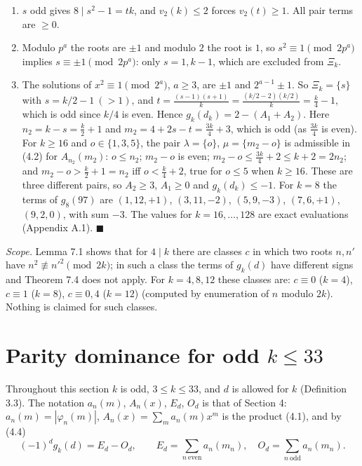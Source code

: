 \begin{enumerate}
\def\labelenumi{(\arabic{enumi})}
\setcounter{enumi}{1}
\item
  \(s\) odd gives \(8\mid s^2-1=tk\), and \(v_2(k)\le2\) forces \(v_2(t)\ge1\). All pair terms are \(\ge0\).
\item
  Modulo \(p^a\) the roots are \(\pm1\) and modulo \(2\) the root is \(1\), so \(s^2\equiv1\pmod{2p^a}\) implies \(s\equiv\pm1\pmod{2p^a}\): only \(s=1,k-1\), which are excluded from \(\Xi_k\).
\item
  The solutions of \(x^2\equiv1\pmod{2^a}\), \(a\ge3\), are \(\pm1\) and \(2^{a-1}\pm1\). So \(\Xi_k=\{s\}\) with \(s=k/2-1\ (>1)\), and \(t=\frac{(s-1)(s+1)}{k}=\frac{(k/2-2)(k/2)}{k}=\frac k4-1\), which is odd since \(k/4\) is even. Hence \(g_k(d_k)=2-(A_1+A_2)\). Here \(n_2=k-s=\frac k2+1\) and \(m_2=4+2s-t=\frac{3k}4+3\), which is odd (as \(\frac{3k}{4}\) is even). For \(k\ge16\) and \(o\in\{1,3,5\}\), the pair \(\lambda=\{o\}\), \(\mu=\{m_2-o\}\) is admissible in (4.2) for \(A_{n_2}(m_2)\): \(o\le n_2\); \(m_2-o\) is even; \(m_2-o\le\frac{3k}4+2\le k+2=2n_2\); and \(m_2-o>\frac k2+1=n_2\) iff \(o<\frac k4+2\), true for \(o\le5\) when \(k\ge16\). These are three different pairs, so \(A_2\ge3\), \(A_1\ge0\) and \(g_k(d_k)\le-1\). For \(k=8\) the terms of \(g_8(97)\) are \((1,12,+1)\), \((3,11,-2)\), \((5,9,-3)\), \((7,6,+1)\), \((9,2,0)\), with sum \(-3\). The values for \(k=16,\dots,128\) are exact evaluations (Appendix A.1). \(\blacksquare\)
\end{enumerate}

\emph{Scope.} Lemma 7.1 shows that for \(4\mid k\) there are classes \(c\) in which two roots \(n,n'\) have \(n^2\not\equiv n'^2\pmod{2k}\); in such a class the terms of \(g_k(d)\) have different signs and Theorem 7.4 does not apply. For \(k=4,8,12\) these classes are: \(c\equiv0\) (\(k=4\)), \(c\equiv1\) (\(k=8\)), \(c\equiv0,4\) (\(k=12\)) (computed by enumeration of \(n\) modulo \(2k\)). Nothing is claimed for such classes.

\section{\texorpdfstring{Parity dominance for odd \(k\le33\)}{Parity dominance for odd k\textbackslash le33}}\label{parity-dominance-for-odd-kle33}

Throughout this section \(k\) is odd, \(3\le k\le33\), and \(d\) is allowed for \(k\) (Definition 3.3). The notation \(a_n(m)\), \(A_n(x)\), \(E_d\), \(O_d\) is that of Section 4: \(a_n(m)=|\varphi_n(m)|\), \(A_n(x)=\sum_ma_n(m)x^m\) is the product (4.1), and by (4.4)
\[(-1)^dg_k(d)=E_d-O_d,\qquad E_d=\sum_{n\ \mathrm{even}}a_n(m_n),\quad O_d=\sum_{n\ \mathrm{odd}}a_n(m_n).\]

